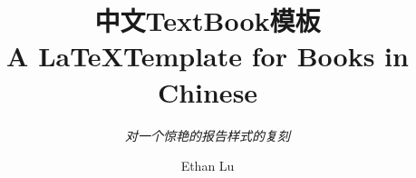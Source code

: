 \documentclass[lang=cn,zihao=5,twoside,fontset=none]{textbook}
\begin{document}
\title{中文TextBook模板\\A \LaTeX Template for Books in Chinese}
\subtitle{\textit{对一个惊艳的报告样式的复刻}}
\author{Ethan Lu}
\date{\zhtoday}
\publishers{家里蹲出版社}

\begin{titlepage} %
\end{titlepage}
\end{document}

